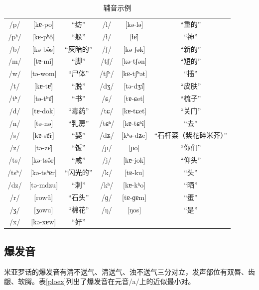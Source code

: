 \begin{table}[H]
\vspace{5pt}
    \centering
    \caption{辅音示例}
    \label{conex}
\begin{tabular}{ccc|ccc}
     \toprule
	/p/ & [kɐ-po] & “纺” & /l/ & [kə-lə] & “重的” \\
	/pʰ/ & [kɐ-pʰô] & “躲” & /ɬ/ & [ɬɐ̂] & “神” \\
	/b/ & [kə-bə̂s] & “灰暗的” & /ʃ/ & [kə-ʃək] & “新的” \\
	/m/ & [tɐ-mî] & “脚” & /tʃ/ & [kə-tʃən] & “短的” \\
	/w/ & [tə-wom] & “尸体” & /tʃʰ/ & [kɐ-tʃʰət] & “插” \\
	/t/ & [kɐ-tɐ̂] & “脱” & /dʒ/ & [tə-dʒɿ̂] & “皮肤” \\ 
	/tʰ/ & [tə-tʰɐ̂] & “书” & /ɕ/ & [tɐ-ɕet] & “梳子” \\ 
	/d/ & [tɐ-dok] & “毒药” & /tɕ/ & [kɐ-tɕet] & “关门” \\ 
	/n/ & [tə-nə] & “乳房” & /tɕʰ/ & [kɐ-tɕʰî] & “去” \\
	/s/ & [kɐ-sɐ̂r] & “娶” & /dʑ/ & [kʰə-dʑe] & “石杆菜（紫花碎米芥）” \\ 
	/z/ & [tə-zɐ̂] & “饭” & /ɲ/ & [ɲo] & “你们” \\ 
	/ts/ & [kə-tsə̂r] & “咸” & /j/ & [kɐ-jok] & “仰头” \\ 
	/tsʰ/ & [kə-tsʰɐr] & “闪光的” & /k/ & [tɐ-ku] & “头” \\ 
	/dz/ & [tə-mdzu] & “刺” & /kʰ/ & [kɐ-kʰo] & “晒” \\ 
	/r/ & [rowû] & “石头” & /ɡ/ & [tɐ-ɡɐm] & “蛋” \\ 
	/ʒ/ & [ʒowu] & “棉花” & /ŋ/ & [ŋos] & “是” \\ 
    /x/ & [kə-xɐw] & “好” &   &   &   \\
   \bottomrule
\end{tabular}
\end{table}

\subsection{爆发音}

米亚罗话的爆发音有清不送气、清送气、浊不送气三分对立，发声部位有双唇、齿龈、软腭。表\ref{ploex}列出了爆发音在元音/a/上的近似最小对。

